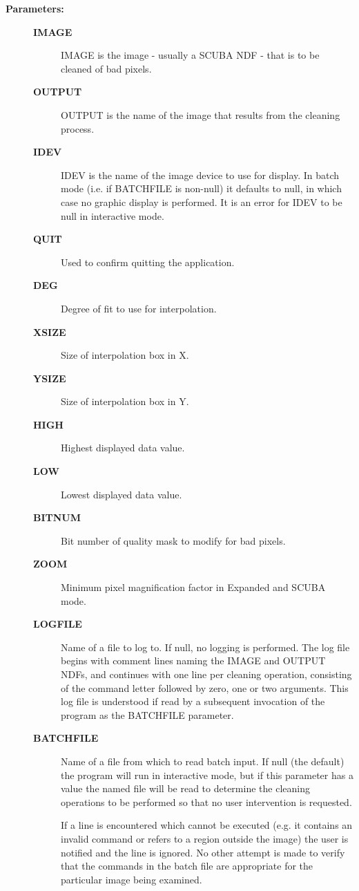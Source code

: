 \begin{description}
\begin{description}
\item [\textbf{Parameters:}]
\begin{description}
\item [\textbf{IMAGE}]
 IMAGE is the image - usually a SCUBA NDF - that is to be
 cleaned of bad pixels.
\item [\textbf{OUTPUT}]
 OUTPUT is the name of the image that results from the cleaning
 process.
\item [\textbf{IDEV}]
 IDEV is the name of the image device to use for display.  In batch
 mode (i.e. if BATCHFILE is non-null) it defaults to null, in which
 case no graphic display is performed.  It is an error for IDEV to
 be null in interactive mode.
\item [\textbf{QUIT}]
 Used to confirm quitting the application.
\item [\textbf{DEG}]
 Degree of fit to use for interpolation.
\item [\textbf{XSIZE}]
 Size of interpolation box in X.
\item [\textbf{YSIZE}]
 Size of interpolation box in Y.
\item [\textbf{HIGH}]
 Highest displayed data value.
\item [\textbf{LOW}]
 Lowest displayed data value.
\item [\textbf{BITNUM}]
 Bit number of quality mask to modify for bad pixels.
\item [\textbf{ZOOM}]
 Minimum pixel magnification factor in Expanded and SCUBA mode.
\item [\textbf{LOGFILE}]
 Name of a file to log to.  If null, no logging is performed.
 The log file begins with comment lines naming the IMAGE and OUTPUT
 NDFs, and continues with one line per cleaning operation,
 consisting of the command letter followed by zero, one or two
 arguments.  This log file is understood if read by a subsequent
 invocation of the program as the BATCHFILE parameter.
\item [\textbf{BATCHFILE}]
 Name of a file from which to read batch input.  If null (the default)
 the program will run in interactive mode, but if this parameter has a
 value the named file will be read to determine the cleaning operations
 to be performed so that no user intervention is requested.

 If a line is encountered which cannot be executed (e.g. it contains
 an invalid command or refers to a region outside the image) the user
 is notified and the line is ignored.  No other attempt is made to
 verify that the commands in the batch file are appropriate for the
 particular image being examined.


\end{description}
\end{description}
\end{description}
